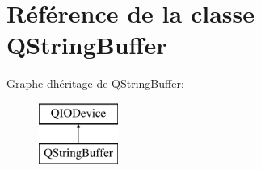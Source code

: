 \hypertarget{class_q_string_buffer}{}\section{Référence de la classe Q\+String\+Buffer}
\label{class_q_string_buffer}
Graphe d\textquotesingle{}héritage de Q\+String\+Buffer\+:\begin{figure}[H]
\begin{center}
\leavevmode
\includegraphics[height=2.000000cm]{class_q_string_buffer}
\end{center}
\end{figure}
